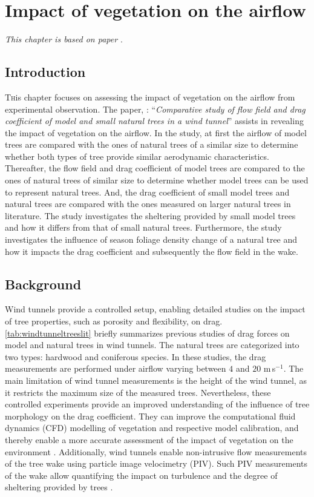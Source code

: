 \chapter{Impact of vegetation on the airflow}
\def\figdir{chapters/ch04_experimentalstudymodels/figures}

\textit{This chapter is based on paper \cite{Manickathan2018b}}.

\section{Introduction}

\lettrine[lines=3,nindent=0em,loversize=0.1]{T}{h}is chapter focuses on assessing the impact of vegetation on the airflow from experimental observation. The paper, \cite{Manickathan2018b}: ``\textit{Comparative study of flow field and drag coefficient of model and small natural trees in a wind tunnel}'' assists in revealing the impact of vegetation on the airflow. In the study, at first the airflow of model trees are compared with the ones of natural trees of a similar size to determine whether both types of tree provide similar aerodynamic characteristics. Thereafter, the flow field and drag coefficient of model trees are compared to the ones of natural trees of similar size to determine whether model trees can be used to represent natural trees. And, the drag coefficient of small model trees and natural trees are compared with the ones measured on larger natural trees in literature. The study investigates the sheltering provided by small model trees and how it differs from that of small natural trees. Furthermore, the study investigates the influence of season foliage density change of a natural tree and how it impacts the drag coefficient and subsequently the flow field in the wake.

\section{Background}

Wind tunnels provide a controlled setup, enabling detailed studies on the impact of tree properties, such as porosity and flexibility, on drag. \cref{tab:windtunneltreeslit} briefly summarizes previous studies of drag forces on model and natural trees in wind tunnels. The natural trees are categorized into two types: hardwood and coniferous species. In these studies, the drag measurements are performed under airflow varying between $4$ and $20$ m\,s$^{-1}$. The main limitation of wind tunnel measurements is the height of the wind tunnel, as it restricts the maximum size of the measured trees. Nevertheless, these controlled experiments provide an improved understanding of the influence of tree morphology on the drag coefficient. They can improve the computational fluid dynamics (CFD) modelling of vegetation and respective model calibration, and thereby enable a more accurate assessment of the impact of vegetation on the environment \citep{Bitog2011,Bitog2012}. Additionally, wind tunnels enable non-intrusive flow measurements of the tree wake using particle image velocimetry (PIV). Such PIV measurements of the wake allow quantifying the impact on turbulence and the degree of sheltering provided by trees \citep{Lee2012,Lee2014565}.

